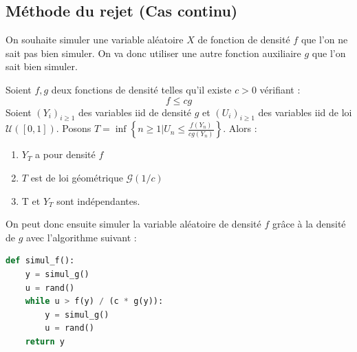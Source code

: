 \subsection{Méthode du rejet (Cas continu)}

On souhaite simuler une variable aléatoire $X$ de fonction de densité $f$ que l'on ne sait pas bien simuler. 
On va donc utiliser une autre fonction auxiliaire $g$ que l'on sait bien simuler. 

\begin{theorem}
    Soient $f,g$ deux fonctions de densité telles qu'il existe $c > 0$ vérifiant : 
        $$ f \leqslant cg $$ 
    Soient $(Y_i)_{i \geqslant1}$ des variables iid de densité $g$ et $ (U_i)_{i \geqslant 1}$ des variables iid 
    de loi $ \mathcal{U}([0,1])$. 
    Posons $ T = \inf \left\{n \geqslant 1 | U_n \leqslant \frac{f(Y_n)}{cg(Y_n)}\right\} $. Alors : 
    \begin{enumerate}
        \item $Y_T$ a pour densité $f$ 
        \item $T$ est de loi géométrique $ \mathcal{G}(1/c)$ 
        \item T et $Y_T$ sont indépendantes.  
    \end{enumerate} 
\end{theorem}

\begin{proposition}
    On peut donc ensuite simuler la variable aléatoire de densité $f$ grâce à la densité de $g$ avec 
    l'algorithme suivant :
    \begin{lstlisting}[language=Python]
def simul_f(): 
    y = simul_g()
    u = rand()
    while u > f(y) / (c * g(y)):
        y = simul_g()
        u = rand() 
    return y
    \end{lstlisting}
\end{proposition}

